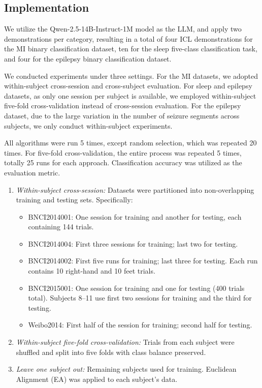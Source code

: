 \documentclass[journal,twocolumn]{IEEEtran}
\begin{document}
\subsection{Implementation}
We utilize the Qwen-2.5-14B-Instruct-1M model as the LLM, and apply two demonstrations per category, resulting in a total of four ICL demonstrations for the MI binary classification dataset, ten for the sleep five-class classification task, and four for the epilepsy binary classification dataset.

We conducted experiments under three settings. For the MI datasets, we adopted within-subject cross-session and cross-subject evaluation. For sleep and epilepsy datasets, as only one session per subject is available, we employed within-subject five-fold cross-validation instead of cross-session evaluation. For the epilepsy dataset, due to the large variation in the number of seizure segments across subjects, we only conduct within-subject experiments.

All algorithms were run 5 times, except random selection, which was repeated 20 times. For five-fold cross-validation, the entire process was repeated 5 times, totally 25 runs for each approach. Classification accuracy was utilized as the evaluation metric.

\begin{enumerate}
\item \emph{Within-subject cross-session:}
Datasets were partitioned into non-overlapping training and testing sets. Specifically:
  \begin{itemize}
	\item BNCI2014001: One session for training and another for testing, each containing 144 trials.
	\item BNCI2014004: First three sessions for training; last two for testing.
    \item BNCI2014002: First five runs for training; last three for testing. Each run contains 10 right-hand and 10 feet trials.
    \item BNCI2015001: One session for training and one for testing (400 trials total). Subjects 8–11 use first two sessions for training and the third for testing.
    \item Weibo2014: First half of the session for training; second half for testing.
  \end{itemize}
  \item \emph{Within-subject five-fold cross-validation:}
Trials from each subject were shuffled and split into five folds with class balance preserved.
  \item \emph{Leave one subject out:} Remaining subjects used for training. Euclidean Alignment (EA) \cite{he2019transfer} was applied to each subject's data.
\end{enumerate}
\end{document}
